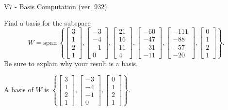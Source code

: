 \begin{exercise}
  \begin{exerciseTitle}V7 - Basis Computation (ver. 932)\end{exerciseTitle}
  \begin{exerciseStatement}
    Find a basis for the subspace 
\[W=\mathrm{span}\ \left\{\left[\begin{array}{r}
3 \\
1 \\
2 \\
1
\end{array}\right] , \left[\begin{array}{r}
-3 \\
-4 \\
-1 \\
0
\end{array}\right] , \left[\begin{array}{r}
21 \\
16 \\
11 \\
4
\end{array}\right] , \left[\begin{array}{r}
-60 \\
-47 \\
-31 \\
-11
\end{array}\right] , \left[\begin{array}{r}
-111 \\
-88 \\
-57 \\
-20
\end{array}\right] , \left[\begin{array}{r}
0 \\
1 \\
2 \\
1
\end{array}\right]\right\}.\]
 Be sure to explain why your result is a basis.


  \end{exerciseStatement}
  \begin{exerciseAnswer}
   A basis of \(W\) is  \(\left\{\left[\begin{array}{r}
3 \\
1 \\
2 \\
1
\end{array}\right] , \left[\begin{array}{r}
-3 \\
-4 \\
-1 \\
0
\end{array}\right] , \left[\begin{array}{r}
0 \\
1 \\
2 \\
1
\end{array}\right]\right\}\).
  


  \end{exerciseAnswer}
\end{exercise}